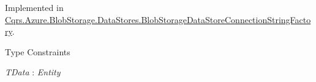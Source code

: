 Implemented in \hyperlink{classCqrs_1_1Azure_1_1BlobStorage_1_1DataStores_1_1BlobStorageDataStoreConnectionStringFactory_a96e368a2b00f9614eff6ca4bcdeb3a24}{Cqrs.\+Azure.\+Blob\+Storage.\+Data\+Stores.\+Blob\+Storage\+Data\+Store\+Connection\+String\+Factory}.

\begin{Desc}
\item[Type Constraints]\begin{description}
\item[{\em T\+Data} : {\em Entity}]\end{description}
\end{Desc}
